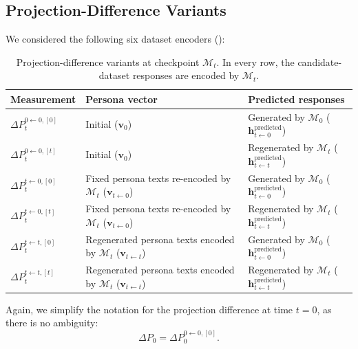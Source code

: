 \subsection{Projection-Difference Variants}
\label{sec:deltap-variants}
We considered the following six dataset encoders ():
\begin{table}[H]
\centering
\small
\begin{tabular}{p{}p{}p{}}
Measurement & Persona vector & Predicted responses \\
\hline
$\Delta P_t^{0\leftarrow0,[0]}$ & Initial ($\mathbf{v}_0$) & Generated by $\mathcal{M}_0$ ($\mathbf{h}^{\text{predicted}}_{t\leftarrow 0}$) \\
$\Delta P_t^{0\leftarrow0,[t]}$ & Initial ($\mathbf{v}_0$) & Regenerated by $\mathcal{M}_t$ ($\mathbf{h}^{\text{predicted}}_{t\leftarrow t}$) \\
$\Delta P_t^{t\leftarrow0,[0]}$ & Fixed persona texts re-encoded by $\mathcal{M}_t$ ($\mathbf{v}_{t\leftarrow0}$) & Generated by $\mathcal{M}_0$ ($\mathbf{h}^{\text{predicted}}_{t\leftarrow 0}$) \\
$\Delta P_t^{t\leftarrow0,[t]}$ & Fixed persona texts re-encoded by $\mathcal{M}_t$ ($\mathbf{v}_{t\leftarrow0}$) & Regenerated by $\mathcal{M}_t$ ($\mathbf{h}^{\text{predicted}}_{t\leftarrow t}$) \\
$\Delta P_t^{t\leftarrow t,[0]}$ & Regenerated persona texts encoded by $\mathcal{M}_t$ ($\mathbf{v}_{t\leftarrow t}$) & Generated by $\mathcal{M}_0$ ($\mathbf{h}^{\text{predicted}}_{t\leftarrow 0}$)  \\
$\Delta P_t^{t\leftarrow t,[t]}$ & Regenerated persona texts encoded by $\mathcal{M}_t$ ($\mathbf{v}_{t\leftarrow t}$) & Regenerated by $\mathcal{M}_t$ ($\mathbf{h}^{\text{predicted}}_{t\leftarrow t}$)  \\
\end{tabular}
\caption{Projection-difference variants at checkpoint $\mathcal{M}_t$. In every row, the candidate-dataset responses are encoded by $\mathcal{M}_t$.}
\label{tab:deltap-variants}
\end{table}
Again, we simplify the notation for the projection difference at time $t=0$, as there is no ambiguity:
\begin{equation}
\Delta P_0
=
\Delta P_0^{0\leftarrow0,[0]}.
\label{eq:deltap-base}
\end{equation}

